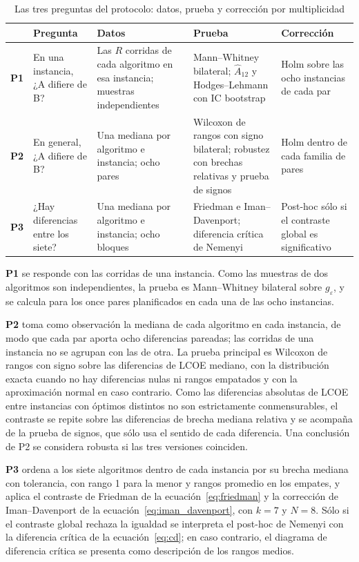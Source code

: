 \begin{table}[H]
\centering
\footnotesize
\caption{Las tres preguntas del protocolo: datos, prueba y corrección por multiplicidad}
\label{tab:preguntas_protocolo}
\renewcommand{\arraystretch}{1.25}
\begin{tabular}{@{}p{0.7cm} p{2.9cm} p{3.7cm} p{4.0cm} p{3.2cm}@{}}
\hline
 & \textbf{Pregunta} & \textbf{Datos} & \textbf{Prueba} & \textbf{Corrección} \\
\hline
\textbf{P1} & En una instancia, ¿A difiere de B? & Las $R$ corridas de cada algoritmo en esa instancia; muestras independientes & Mann--Whitney bilateral; $\hat{A}_{12}$ y Hodges--Lehmann con IC bootstrap & Holm sobre las ocho instancias de cada par \\
\textbf{P2} & En general, ¿A difiere de B? & Una mediana por algoritmo e instancia; ocho pares & Wilcoxon de rangos con signo bilateral; robustez con brechas relativas y prueba de signos & Holm dentro de cada familia de pares \\
\textbf{P3} & ¿Hay diferencias entre los siete? & Una mediana por algoritmo e instancia; ocho bloques & Friedman e Iman--Davenport; diferencia crítica de Nemenyi & Post-hoc sólo si el contraste global es significativo \\
\hline
\end{tabular}
\end{table}

\textbf{P1} se responde con las corridas de una instancia. Como las muestras de dos algoritmos son independientes, la prueba es Mann--Whitney bilateral sobre $g_\varepsilon$, y se calcula para los once pares planificados en cada una de las ocho instancias.

\textbf{P2} toma como observación la mediana de cada algoritmo en cada instancia, de modo que cada par aporta ocho diferencias pareadas; las \Replicates{} corridas de una instancia no se agrupan con las de otra. La prueba principal es Wilcoxon de rangos con signo sobre las diferencias de LCOE mediano, con la distribución exacta cuando no hay diferencias nulas ni rangos empatados y con la aproximación normal en caso contrario. Como las diferencias absolutas de LCOE entre instancias con óptimos distintos no son estrictamente conmensurables, el contraste se repite sobre las diferencias de brecha mediana relativa y se acompaña de la prueba de signos, que sólo usa el sentido de cada diferencia. Una conclusión de P2 se considera robusta si las tres versiones coinciden.

\textbf{P3} ordena a los siete algoritmos dentro de cada instancia por su brecha mediana con tolerancia, con rango 1 para la menor y rangos promedio en los empates, y aplica el contraste de Friedman de la ecuación~\eqref{eq:friedman} y la corrección de Iman--Davenport de la ecuación~\eqref{eq:iman_davenport}, con $k=7$ y $N=8$. Sólo si el contraste global rechaza la igualdad se interpreta el post-hoc de Nemenyi con la diferencia crítica de la ecuación~\eqref{eq:cd}; en caso contrario, el diagrama de diferencia crítica se presenta como descripción de los rangos medios.

